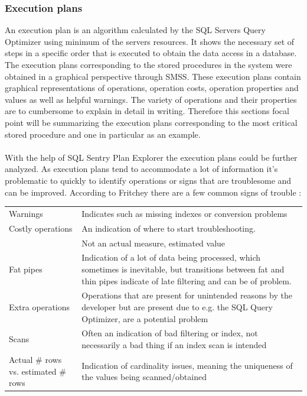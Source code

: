 \documentclass{cslthse-msc}
\begin{document}
\subsubsection{Execution plans}
An execution plan is an algorithm calculated by the SQL Servers Query Optimizer using minimum of  the servers resources. It shows the necessary set of steps in a specific order that is executed to obtain the data access in a database. The execution plans corresponding to the stored procedures in the system were obtained in a graphical perspective through SMSS. These execution plans contain graphical representations of operations, operation costs, operation properties and values as well as helpful warnings. The variety of operations and their properties are to cumbersome to explain in detail in writing. Therefore this sections focal point will be summarizing the execution plans corresponding to the most critical stored procedure and one in particular as an example.\\\\      
With the help of SQL Sentry Plan Explorer the execution plans could be further analyzed. As execution plans tend to accommodate a lot of information it's problematic to quickly to identify operations or signs that are troublesome and can be improved. According to Fritchey there are a few common signs of trouble \cite{fritchey2}:
\begin{table}[H]
\begin{center}
\begin{tabular}{p{3cm} p{10cm}}
Warnings & Indicates such as missing indexes or conversion problems\\
Costly operations & An indication of where to start troubleshooting.\\ & Not an actual measure, estimated value\\
Fat pipes & Indication of a lot of data being processed, which sometimes is inevitable, but transitions between fat and thin pipes indicate of late filtering and can be of problem.\\
Extra operations & Operations that are present for unintended reasons by the developer but are present due to e.g. the SQL Query Optimizer, are a potential problem\\
Scans & Often an indication of bad filtering or index, not necessarily a bad thing if an index scan is intended\\
Actual \# rows vs. estimated \# rows & Indication of cardinality issues, meaning the uniqueness of the values being scanned/obtained \\
\end{tabular}
\end{center}
\end{table}
 
\end{document}
